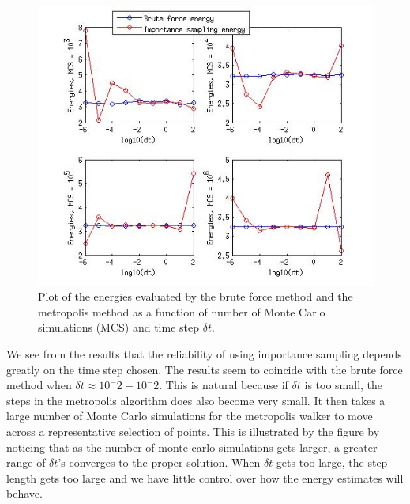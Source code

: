 \begin{figure}[h!]
	\centering 
	\includegraphics[width=\textwidth]{results/importance_sampling.jpg}
	\caption{Plot of the energies evaluated by the brute force method and the metropolis method as a function of number of Monte Carlo simulations (MCS) and time step $\delta t$.}
	\label{fig:importance_sampling}
\end{figure}

We see from the results that the reliability of using importance sampling depends greatly on the time step chosen. 
The results seem to coincide with the brute force method when $\delta t \approx 10^-2 - 10^-2$.
This is natural because if $\delta t$ is too small, the steps in the metropolis algorithm does also become very small. 
It then takes a large number of Monte Carlo simulations for the metropolis walker to move across a representative  selection of points. 
This is illustrated by the figure by noticing that as the number of monte carlo simulations gets larger, a greater range of $\delta t$'s converges to the proper solution. 
When $\delta t$ gets too large, the step length gets too large and we have little control over how the energy estimates will behave. 

